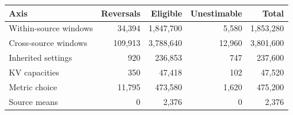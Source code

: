 \begin{tabular}{lrrrr}\toprule
Axis & Reversals & Eligible & Unestimable & Total \\ \midrule
Within-source windows & 34,394 & 1,847,700 & 5,580 & 1,853,280 \\
Cross-source windows & 109,913 & 3,788,640 & 12,960 & 3,801,600 \\
Inherited settings & 920 & 236,853 & 747 & 237,600 \\
KV capacities & 350 & 47,418 & 102 & 47,520 \\
Metric choice & 11,795 & 473,580 & 1,620 & 475,200 \\
Source means & 0 & 2,376 & 0 & 2,376 \\
\bottomrule\end{tabular}
